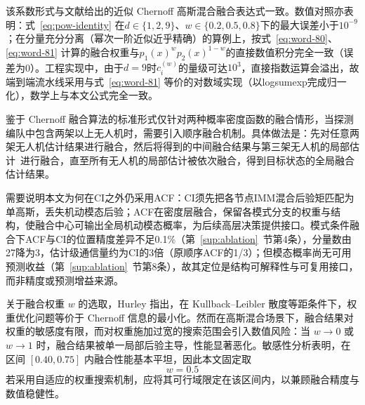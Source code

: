 \documentclass[UTF8,a4paper,zihao=-4]{ctexart}
\begin{document}
该系数形式与文献给出的近似 Chernoff 高斯混合融合表达式一致\cite{ahmed2012,gunay2015,gunay2016,zhu2016}。数值对照亦表明：式~\eqref{eq:pow-identity} 在\(d\in\{1,2,9\}\)、\(w\in\{0.2,0.5,0.8\}\)下的最大误差小于\(10^{-9}\)；在分量充分分离（幂次一阶近似近乎精确）的算例上，按式~\eqref{eq:word-80}、\eqref{eq:word-81} 计算的融合权重与\(p_1(x)^{w}p_2(x)^{1-w}\)的直接数值积分完全一致（误差为0）。工程实现中，由于\(d=9\)时\(c_{i}^{(w)}\)的量级可达\(10^{3}\)，直接指数运算会溢出，故端到端流水线采用与式~\eqref{eq:word-81} 等价的对数域实现（以logsumexp完成归一化），数学上与本文公式完全一致。

鉴于 Chernoff
融合算法的标准形式仅针对两种概率密度函数的融合情形，当探测编队中包含两架以上无人机时，需要引入顺序融合机制。具体做法是：先对任意两架无人机估计结果进行融合，然后将得到的中间融合结果与第三架无人机的局部估计~进行融合，直至所有无人机的局部估计被依次融合，得到目标状态的全局融合估计结果。

需要说明本文为何在CI之外仍采用ACF：CI须先把各节点IMM混合后验矩匹配为单高斯，丢失机动模态后验；ACF在密度层融合，保留各模式分支的权重与结构，使融合中心可输出全局机动模态概率，为后续高层决策提供接口。模式条件融合下ACF与CI的位置精度差异不足0.1\%（第~\ref{sup:ablation}~节第4条），分量数由27降为3，估计级通信量约为CI的3倍（原顺序ACF的1/3）；但模态概率尚无可用预测收益（第~\ref{sup:ablation}~节第8条），故其定位是结构可解释性与可复用接口，而非精度或预测增益来源。


关于融合权重 \(w\) 的选取，Hurley\cite{hurley2002} 指出，在 Kullback--Leibler 散度等距条件下，权重优化问题等价于 Chernoff 信息的最小化。然而在高斯混合场景下，融合结果对权重的敏感度有限，而对权重施加过宽的搜索范围会引入数值风险：当 \(w\to0\) 或 \(w\to1\) 时，融合结果被单一局部后验主导，性能显著恶化。敏感性分析表明，在区间 \([0.40,0.75]\) 内融合性能基本平坦，因此本文固定取
\begin{equation}
w=0.5
\label{eq:weight-fixed}
\end{equation}
若采用自适应的权重搜索机制，应将其可行域限定在该区间内，以兼顾融合精度与数值稳健性。
\end{document}
